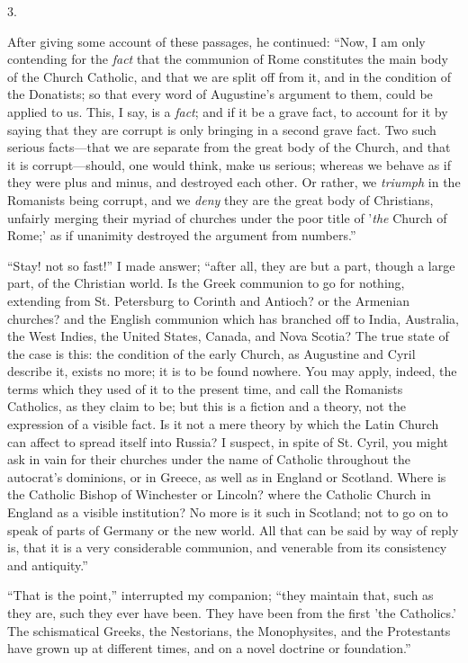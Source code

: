 3.

After giving some account of these passages, he
continued: ``Now, I am only contending for the \emph{fact} that the
communion of Rome constitutes the main body of the Church Catholic,
and that we are split off from it, and in the condition of the
Donatists; so that every word of Augustine's argument to them, could
be applied to us. This, I say, is a \emph{fact}; and if it be a grave
fact, to account for it by saying that they are corrupt is only
bringing in a second grave fact. Two such serious facts—that we are
separate from the great body of the Church, and that it is
corrupt—should, one would think, make us serious; whereas we behave
as if they were plus and minus, and destroyed each other. Or rather,
we \emph{triumph} in the Romanists being corrupt, and we \emph{deny}
they are the great body of Christians, unfairly merging their myriad
of churches under the poor title of '\emph{the} Church of Rome;' as if
unanimity destroyed the argument from numbers.''

``Stay! not so fast!'' I made answer; ``after all,
they are but a part, though a large part, of the Christian world. Is
the Greek communion to go for nothing, extending from St. Petersburg
to Corinth and Antioch? or the Armenian churches? and the English
communion which has branched off to India, Australia, the West Indies,
the United States, Canada, and Nova Scotia? The true state of the case
is this: the condition of the early Church, as Augustine and Cyril
describe it, exists no more; it is to be found nowhere. You may apply,
indeed, the terms which they used of it to the present time, and call
the Romanists Catholics, as they claim to be; but this is a fiction
and a theory, not the expression of a visible fact. Is it not a mere
theory by which the Latin Church can affect to spread itself into
Russia? I suspect, in spite of St. Cyril, you might ask in vain for
their churches under the name of Catholic throughout the autocrat's
dominions, or in Greece, as well as in England or Scotland. Where is
the Catholic Bishop of Winchester or Lincoln? where the Catholic
Church in England as a visible institution? No more is it such in
Scotland; not to go on to speak of parts of Germany or the new world.
All that can be said by way of reply is, that it is a very
considerable communion, and venerable from its consistency and
antiquity.''

``That is the point,'' interrupted my companion; ``they
maintain that, such as they are, such they ever have been. They have
been from the first 'the Catholics.' The schismatical Greeks, the
Nestorians, the Monophysites, and the Protestants have grown up at
different times, and on a novel doctrine or foundation.''


